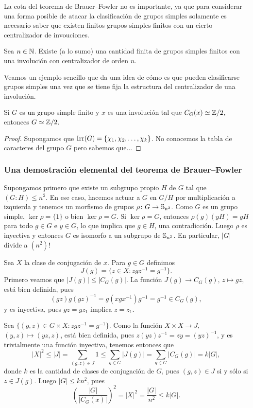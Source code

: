 La cota del teorema de Brauer--Fowler no es importante, ya que
para considerar una forma posible de atacar la clasificación de grupos simples 
solamente es necesario saber que existen  
finitos grupos simples finitos con un cierto centralizador de invouciones.

\begin{corollary}
Sea $n\in\mathbb{N}$. Existe (a lo sumo) una cantidad finita de grupos simples 
finitos con una involución con centralizador de orden $n$. 
\end{corollary}

Veamos un ejemplo sencillo que da una idea de cómo es que pueden clasificarse grupos simples
una vez que se tiene fija la estructura del centralizador de una involución. 

\begin{proposition}
Si $G$ es un grupo simple finito y $x$ es una involución tal que $C_G(x)\simeq\mathbb{Z}/2$, entonces
$G\simeq\mathbb{Z}/2$. 
\end{proposition}

\begin{proof}
Supongamos que $\operatorname{Irr}(G)=\{\chi_1,\chi_2,\dots,\chi_k\}$. No conocemos la tabla de caracteres del grupo $G$ 
pero sabemos que...
\end{proof}

\subsubsection*{Una demostración elemental del teorema de Brauer--Fowler}

Supongamos primero que existe un subgrupo propio $H$ de $G$ tal que
$(G:H)\leq n^2$. En ese caso, hacemos actuar a $G$ en $G/H$ por multiplicación a izquierda 
y tenemos un morfismo de grupos $\rho\colon G\to\mathbb{S}_{n^2}$. Como $G$ es un grupo simple, 
$\ker\rho=\{1\}$ o bien $\ker\rho=G$. Si $\ker\rho=G$, entonces $\rho(g)(yH)=yH$ para todo
$g\in G$ e $y\in G$, lo que implica que $g\in H$, una contradicción. Luego $\rho$ es inyectiva
y entonces $G$ es isomorfo a un subgrupo de $\mathbb{S}_{n^2}$. En particular, $|G|$ divide a $(n^2)!$

Sea $X$ la clase de conjugación de $x$. Para $g\in G$ definimos
\[
J(g)=\{z\in X:zgz^{-1}=g^{-1}\}.
\]
Primero veamos que $|J(g)|\leq|C_G(g)|$. La función $J(g)\to C_G(g)$, $z\mapsto gz$, está bien definida, 
pues 
\[
(gz)g(gz)^{-1}=g(xgx^{-1})g^{-1}=g^{-1}\in C_G(g),
\]
y es inyectiva, pues $gz=gz_1$ implica $z=z_1$.

Sea $\{(g,z)\in G\times X:zgz^{-1}=g^{-1}\}$.  
Como la función $X\times X\to J$, $(y,z)\mapsto (yz,z)$, 
está bien definida, pues $z(yz)z^{-1}=zy=(yz)^{-1}$, y es trivialmente una función inyectiva, 
tenemos entonces que
\[
|X|^2\leq |J|=\sum_{(g,z)\in J}1\leq\sum_{g\in G}|J(g)|=\sum_{g\in G}|C_G(g)|=k|G|,
\]
donde $k$ es la cantidad de clases de conjugación de $G$, 
pues $(g,z)\in J$ si y sólo si $z\in J(g)$. Luego $|G|\leq kn^2$, pues
\[
\left(\frac{|G|}{|C_G(x)|}\right)^2=|X|^2=\frac{|G|}{n^2}\leq k|G|.
\]

